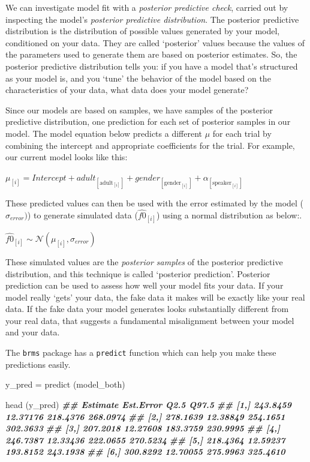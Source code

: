 \documentclass[
]{book}
\newenvironment{Shaded}{\begin{snugshade}}{\end{snugshade}}
\newcommand{\DocumentationTok}[1]{\textcolor[rgb]{0.56,0.35,0.01}{\textbf{\textit{#1}}}}
\newcommand{\FunctionTok}[1]{\textcolor[rgb]{0.00,0.00,0.00}{#1}}
\newcommand{\NormalTok}[1]{#1}
\newcommand{\OtherTok}[1]{\textcolor[rgb]{0.56,0.35,0.01}{#1}}
\begin{document}
We can investigate model fit with a \emph{posterior predictive check}, carried out by inspecting the model's \emph{posterior predictive distribution}. The posterior predictive distribution is the distribution of possible values generated by your model, conditioned on your data. They are called `posterior' values because the values of the parameters used to generate them are based on posterior estimates. So, the posterior predictive distribution tells you: if you have a model that's structured as your model is, and you `tune' the behavior of the model based on the characteristics of your data, what data does your model generate?

Since our models are based on samples, we have samples of the posterior predictive distribution, one prediction for each set of posterior samples in our model. The model equation below predicts a different \(\mu\) for each trial by combining the intercept and appropriate coefficients for the trial. For example, our current model looks like this:

\(\mu_{[i]} = Intercept + adult_{[\mathrm{adult}_{[i]}]} + gender_{[\mathrm{gender}_{[i]}]} + \alpha_{[\mathrm{speaker}_{[i]}]}\)

These predicted values can then be used with the error estimated by the model (\(\sigma_{error})\)) to generate simulated data (\(\hat{f0}_{[i]}\)) using a normal distribution as below:.

\(\hat{f0}_{[i]} \sim \mathcal{N}(\mu_{[i]},\sigma_{error})\)

These simulated values are the \emph{posterior samples} of the posterior predictive distribution, and this technique is called `posterior prediction'. Posterior prediction can be used to assess how well your model fits your data. If your model really `gets' your data, the fake data it makes will be exactly like your real data. If the fake data your model generates looks substantially different from your real data, that suggests a fundamental misalignment between your model and your data.

The \texttt{brms} package has a \texttt{predict} function which can help you make these predictions easily.

\begin{Shaded}
\begin{Highlighting}[]
\NormalTok{y\_pred }\OtherTok{=} \FunctionTok{predict}\NormalTok{ (model\_both)}

\FunctionTok{head}\NormalTok{ (y\_pred)}
\DocumentationTok{\#\#      Estimate Est.Error     Q2.5    Q97.5}
\DocumentationTok{\#\# [1,] 243.8459  12.37176 218.4376 268.0974}
\DocumentationTok{\#\# [2,] 278.1639  12.38849 254.1651 302.3633}
\DocumentationTok{\#\# [3,] 207.2018  12.27608 183.3759 230.9995}
\DocumentationTok{\#\# [4,] 246.7387  12.33436 222.0655 270.5234}
\DocumentationTok{\#\# [5,] 218.4364  12.59237 193.8152 243.1938}
\DocumentationTok{\#\# [6,] 300.8292  12.70055 275.9963 325.4610}
\end{Highlighting}
\end{Shaded}
\end{document}
